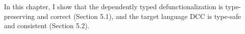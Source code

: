 
In this chapter, I show that the dependently typed defunctionalization is type-preserving and correct (Section 5.1), and the target language DCC is type-safe and consistent (Section 5.2).



% 
